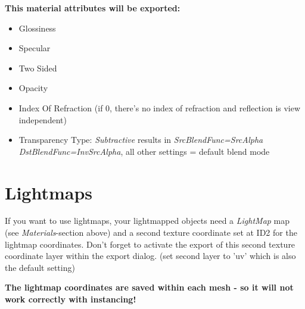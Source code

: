 \textbf{This material attributes will be exported:}
\begin{itemize}
\item{Glossiness}
\item{Specular}
\item{Two Sided}
\item{Opacity}
\item{Index Of Refraction (if 0, there's no index of refraction and reflection is view independent)}
\item{Transparency Type: \emph{Subtractive} results in \emph{SrcBlendFunc=SrcAlpha  DstBlendFunc=InvSrcAlpha}, all other settings = default blend mode}
\end{itemize}




\section{Lightmaps}
If you want to use lightmaps, your lightmapped objects need a \emph{LightMap} map (see \emph{Materials}-section above) and a second texture coordinate set at ID2 for the lightmap coordinates. Don't forget to activate the export of this second texture coordinate layer within the export dialog. (set second layer to 'uv' which is also the default setting)

\textbf{The lightmap coordinates are saved within each mesh - so it will not work correctly with instancing!}
